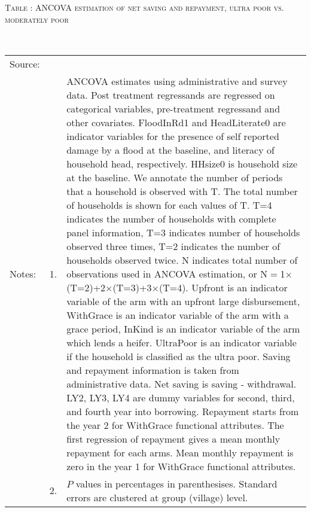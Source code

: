 \hspace{-1cm}\begin{minipage}[t]{14cm}
\hfil\textsc{\normalsize Table \thetable: ANCOVA estimation of net saving and repayment, ultra poor vs. moderately poor\label{tab ANCOVA Repayment poverty}}\\
\setlength{\tabcolsep}{1pt}
\setlength{\baselineskip}{8pt}
\renewcommand{\arraystretch}{.55}
\hspace{-.75cm}\\
\renewcommand{\arraystretch}{.8}
\setlength{\tabcolsep}{1pt}
\begin{tabular}{>{\hfill\scriptsize}p{1cm}<{}>{\hfill\scriptsize}p{.25cm}<{}>{\scriptsize}p{12cm}<{\hfill}}
Source:& \multicolumn{2}{l}{\scriptsize Estimated with GUK administrative and survey data.}\\
Notes: & 1. & ANCOVA estimates using administrative and survey data. Post treatment regressands are regressed on categorical variables, pre-treatment regressand and other covariates. \textsf{FloodInRd1} and \textsf{HeadLiterate0} are indicator variables for the presence of self reported damage by a flood at the baseline, and literacy of household head, respectively. \textsf{HHsize0} is household size at the baseline. We annotate the number of periods that a household is observed with \textsf{T}. The total number of households is shown for each values of \textsf{T}. \textsf{T=4} indicates the number of households with complete panel information, \textsf{T=3} indicates number of households observed three times, \textsf{T=2} indicates the number of households observed twice. \textsf{N} indicates total number of observations used in ANCOVA estimation, or \textsf{N$=$1$\times$(T=2)+2$\times$(T=3)+3$\times$(T=4)}.  \textsf{Upfront} is an indicator variable of the arm with an upfront large disbursement, \textsf{WithGrace} is an indicator variable of the arm with a grace period, \textsf{InKind} is an indicator variable of the arm which lends a heifer. \textsf{UltraPoor} is an indicator variable if the household is classified as the ultra poor. Saving and repayment information is taken from administrative data. Net saving is saving - withdrawal. %
\textsf{LY2, LY3, LY4} are dummy variables for second, third, and fourth year into borrowing.  Repayment starts from the year 2 for \textsf{WithGrace} functional attributes. The first regression of repayment gives a mean monthly repayment for each arms. Mean monthly repayment is zero in the year 1 for \textsf{WithGrace} functional attributes.\\
& 2. & $P$ values in percentages in parenthesises. Standard errors are clustered at group (village) level.
\end{tabular}
\end{minipage}

